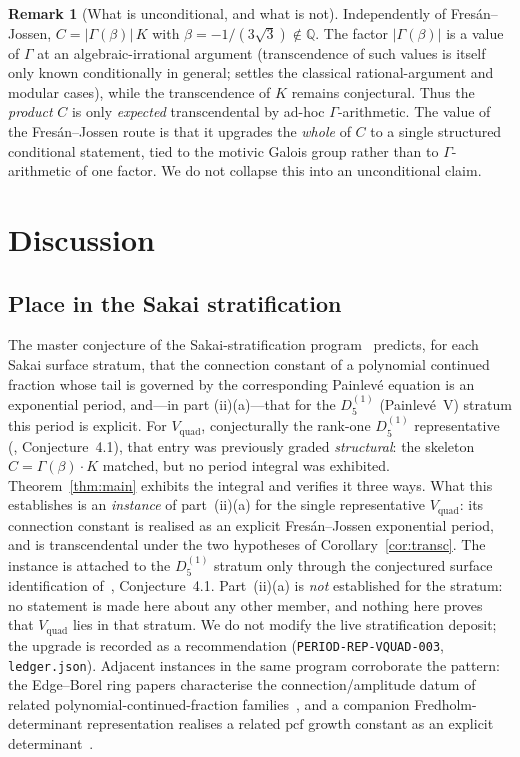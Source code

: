 \documentclass[11pt,reqno]{amsart}
\renewcommand{\_}{\vquadorigunderscore\allowbreak}
\theoremstyle{plain}
\theoremstyle{definition}
\newtheorem{remark}[theorem]{Remark}
\newcommand{\Vquad}{V_{\mathrm{quad}}}
\providecommand{\C}{}\renewcommand{\C}{C}
\begin{document}
\begin{remark}[What is unconditional, and what is not]\label{rmk:uncond}
Independently of Fres\'an--Jossen, $\C=\lvert\Gamma(\beta)\rvert\,K$ with
$\beta=-1/(3\sqrt3)\notin\mathbb{Q}$. The factor $\lvert\Gamma(\beta)\rvert$ is a value of
$\Gamma$ at an algebraic-irrational argument (transcendence of such values is itself only known
conditionally in general; \cite{Nesterenko} settles the classical rational-argument and modular
cases), while the transcendence of $K$ remains conjectural. Thus the \emph{product} $\C$ is only
\emph{expected} transcendental by ad-hoc $\Gamma$-arithmetic. The value of the Fres\'an--Jossen
route is that it upgrades the \emph{whole} of $\C$ to a single structured conditional statement,
tied to the motivic Galois group rather than to $\Gamma$-arithmetic of one factor. We do not
collapse this into an unconditional claim.
\end{remark}

\section{Discussion}\label{sec:disc}

\subsection{Place in the Sakai stratification}
The master conjecture of the Sakai-stratification program~\cite{Sakai} predicts, for each Sakai
surface stratum, that the connection constant of a polynomial continued fraction whose tail is
governed by the corresponding Painlev\'e equation is an exponential period, and---in part
(ii)(a)---that for the $D_5^{(1)}$ (Painlev\'e~V) stratum this period is explicit. For $\Vquad$,
conjecturally the rank-one $D_5^{(1)}$ representative (\cite{Vquad}, Conjecture~4.1), that
entry was previously graded \emph{structural}: the
skeleton $\C=\Gamma(\beta)\cdot K$ matched, but no period integral was exhibited.
Theorem~\ref{thm:main} exhibits the integral and verifies it three ways. What this
establishes is an \emph{instance} of part~(ii)(a) for the single representative $\Vquad$:
its connection constant is realised as an explicit Fres\'an--Jossen exponential period, and
is transcendental under the two hypotheses of Corollary~\ref{cor:transc}. The instance is
attached to the $D_5^{(1)}$ stratum only through the conjectured surface identification
of~\cite{Vquad}, Conjecture~4.1. Part~(ii)(a) is \emph{not} established for the stratum: no
statement is made here about any other member, and nothing here proves that $\Vquad$ lies in
that stratum. We do not modify
the live stratification deposit; the upgrade is recorded as a recommendation
(\texttt{PERIOD-REP-VQUAD-003}, \texttt{ledger.json}). Adjacent instances in the same program
corroborate the pattern: the Edge--Borel ring papers characterise the connection/amplitude datum of
related polynomial-continued-fraction families~\cite{EBRIb,EBRII}, and a companion
Fredholm-determinant representation realises a related $\mathrm{pcf}$ growth constant as an explicit
determinant~\cite{FredDelta}.
\end{document}
